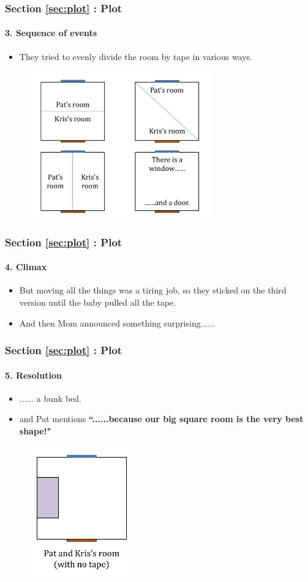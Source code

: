 \documentclass{beamer}
\begin{document}
	\begin{frame}
		\frametitle{Section \ref{sec:plot} : Plot}
		\framesubtitle{3. Sequence of events}
		\begin{itemize}
			\item They tried to evenly divide the room by tape in various ways.
		\end{itemize}
		\begin{figure}
			\centering
			\includegraphics[width=0.7\textwidth]{res/room3_cropped.pdf}
		\end{figure}
	\end{frame}
	
	\begin{frame}
		\frametitle{Section \ref{sec:plot} : Plot}
		\framesubtitle{4. Climax}
		\begin{itemize}
			\item But moving all the things was a tiring job, so they sticked on the third version until the baby pulled all the tape.
			\item And then Mom announced something surprising......
		\end{itemize}
	\end{frame}
	
	\begin{frame}
		\frametitle{Section \ref{sec:plot} : Plot}
		\framesubtitle{5. Resolution}
		\begin{itemize}
			\item ......{\color{cyan} a bunk bed}.
			\item and Pat mentions {\bf ``......because our big square room is the very best shape!"}
		\end{itemize}
		\begin{figure}
			\centering
			\includegraphics[width=0.4\textwidth]{res/room4_cropped.pdf}
		\end{figure}
	\end{frame}
	
\end{document}
